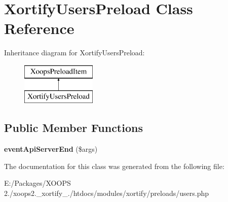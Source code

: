\hypertarget{class_xortify_users_preload}{\section{Xortify\-Users\-Preload Class Reference}
\label{class_xortify_users_preload}
}
Inheritance diagram for Xortify\-Users\-Preload\-:\begin{figure}[H]
\begin{center}
\leavevmode
\includegraphics[height=2.000000cm]{class_xortify_users_preload}
\end{center}
\end{figure}
\subsection*{Public Member Functions}
\begin{DoxyCompactItemize}
\item 
\hypertarget{class_xortify_users_preload_aefff1f3c14d2705c2cc4de04658bb350}{{\bfseries event\-Api\-Server\-End} (\$args)}\label{class_xortify_users_preload_aefff1f3c14d2705c2cc4de04658bb350}

\end{DoxyCompactItemize}


The documentation for this class was generated from the following file\-:\begin{DoxyCompactItemize}
\item 
E\-:/\-Packages/\-X\-O\-O\-P\-S 2./xoops2.\-\_\-xortify\-\_./htdocs/modules/xortify/preloads/users.\-php\end{DoxyCompactItemize}
